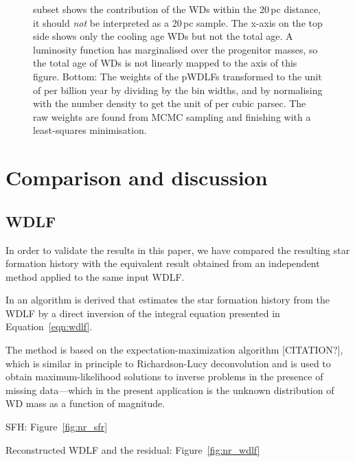 \documentclass[fleqn,usenatbib]{mnras}
\begin{document}
\begin{figure}
{    subset shows the contribution of the WDs within the 20\,pc distance, it
    should \textit{not} be interpreted as a 20\,pc sample. The x-axis on
    the top side shows only the cooling age WDs but not the total age. A
    luminosity function has marginalised over the progenitor masses, so the total
    age of WDs is not linearly mapped to the axis of this figure. Bottom: The
    weights of the pWDLFs transformed to the unit of per billion year by dividing
    by the bin widths, and by normalising with the number density to get the
    unit of per cubic parsec. The raw weights are found from MCMC sampling
    and finishing with a least-squares minimisation.}
    \label{fig:sfh_optimal}
\end{figure}


\section{Comparison and discussion}
\label{sec:comparison}

\subsection{WDLF}
\label{sec:inversion}
In order to validate the results in this paper, we have compared the
resulting star formation history with the equivalent result obtained from an
independent method applied to the same input WDLF.

In \citet{2013MNRAS.434.1549R} an algorithm is derived that estimates the star
formation history from the WDLF by a direct inversion of the integral equation
presented in Equation~\ref{eqn:wdlf}.

The method is based on the expectation-maximization algorithm [CITATION?], which is
similar in principle to Richardson-Lucy deconvolution and is used to obtain
maximum-likelihood solutions to inverse problems in the presence of missing data---which
in the present application is the unknown distribution of WD mass as a function
of magnitude.


SFH: Figure~\ref{fig:nr_sfr}

Reconstructed WDLF and the residual: Figure~\ref{fig:nr_wdlf}
\end{document}
